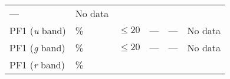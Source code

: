 \documentclass[DM,toc]{lsstdoc}
\begin{document}
\begin{longtable}[]{@{}llllll@{}}
\begin{minipage}[t]{0.12\columnwidth}
---\strut
\end{minipage} & \begin{minipage}[t]{0.17\columnwidth}\raggedright\strut
No data\strut
\end{minipage}\tabularnewline
\begin{minipage}[t]{0.14\columnwidth}\raggedright\strut
PF1 (\emph{u} band)\strut
\end{minipage} & \begin{minipage}[t]{0.06\columnwidth}\raggedright\strut
\%\strut
\end{minipage} & \begin{minipage}[t]{0.17\columnwidth}\raggedright\strut
\(\leq 20\)\strut
\end{minipage} & \begin{minipage}[t]{0.17\columnwidth}\raggedright\strut
---\strut
\end{minipage} & \begin{minipage}[t]{0.12\columnwidth}\raggedright\strut
---\strut
\end{minipage} & \begin{minipage}[t]{0.17\columnwidth}\raggedright\strut
No data\strut
\end{minipage}\tabularnewline
\begin{minipage}[t]{0.14\columnwidth}\raggedright\strut
PF1 (\emph{g} band)\strut
\end{minipage} & \begin{minipage}[t]{0.06\columnwidth}\raggedright\strut
\%\strut
\end{minipage} & \begin{minipage}[t]{0.17\columnwidth}\raggedright\strut
\(\leq 20\)\strut
\end{minipage} & \begin{minipage}[t]{0.17\columnwidth}\raggedright\strut
---\strut
\end{minipage} & \begin{minipage}[t]{0.12\columnwidth}\raggedright\strut
---\strut
\end{minipage} & \begin{minipage}[t]{0.17\columnwidth}\raggedright\strut
No data\strut
\end{minipage}\tabularnewline
\begin{minipage}[t]{0.14\columnwidth}\raggedright\strut
PF1 (\emph{r} band)\strut
\end{minipage} & \begin{minipage}[t]{0.06\columnwidth}\raggedright\strut
\%\strut
\end{minipage} & \begin{minipage}[t]{0.17\columnwidth}\raggedright\strut

\end{minipage}
\end{longtable}
\end{document}
